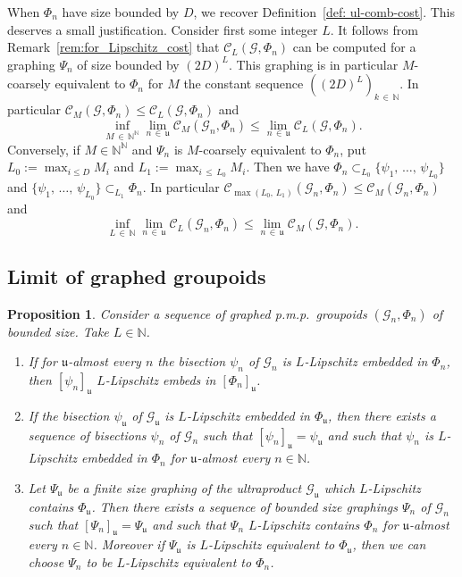 \documentclass[10pt]{amsart}
\newtheorem{prop}[cdrthm]{Proposition}
\theoremstyle{definition}
\newcommand{\Nmath}{\mathbb{N}}
\newcommand{\cost}{\mathcal{C}}
\newcommand{\cg}{\mathcal{G}}
\newcommand{\ul}{\mathfrak{u}}
\newcommand{\pmp}{p.m.p.\ }
\newcommand*{\romanenumi}{\renewcommand*{\theenumi}{\roman{enumi}}}
\begin{document}
When $\Phi_n$ have size bounded by $D$, we recover Definition~\ref{def: ul-comb-cost}. This deserves a small justification. Consider first some integer $L$. It follows from Remark~\ref{rem:for_Lipschitz_cost} that $\cost_{L}(\cg,\Phi_n)$ can be computed for a graphing $\Psi_n$ of size bounded by $(2D)^{L}$. This graphing is in particular $M$-coarsely equivalent to $\Phi_n$ for $M$ the constant sequence $((2D)^L)_{k\, \in\,\Nmath}$. In particular $\cost_M(\cg,\Phi_n) \leq \cost_{L}(\cg,\Phi_n)$ and
\[
\inf_{M\,\in\,\Nmath^\Nmath} \lim_{n\,\in\,\ul}\cost_M(\cg_n,\Phi_n) \leq \lim_{n\,\in\,\ul} \cost_{L}(\cg,\Phi_n).
\]
Conversely, if $M \in \Nmath^\Nmath$ and $\Psi_n$ is $M$-coarsely equivalent to $\Phi_n$, put $L_0 := \max_{i \leq D} M_i$ and $L_1:=\max_{i\,\leq\,L_0} M_i$. Then we have $\Phi_n \subset_{L_0} \{\psi_1,\,\dots,\,\psi_{L_0}\}$ and $\{\psi_1,\,\dots,\,\psi_{L_0}\} \subset_{L_1} \Phi_n$. In particular $\cost_{\max(L_0,\,L_1)}(\cg_n,\Phi_n) \leq \cost_M(\cg_n,\Phi_n)$ and
\[
\inf_{L\,\in\,\Nmath} \lim_{n\,\in\,\ul}\cost_L(\cg_n,\Phi_n) \leq \lim_{n\,\in\,\ul} \cost_{M}(\cg,\Phi_n).
\]


\subsection{Limit of graphed groupoids}

\begin{prop}\label{prop:compar}
Consider a sequence of graphed \pmp groupoids $(\cg_n,\Phi_n)$ of bounded size. Take $L\in\Nmath$.
\begin{enumerate}\romanenumi
\item \label{item: limit of L-Lip embedd gr are L-Lip embedd}
If for $\ul$-almost every $n$ the bisection $\psi_n$ of $\cg_n$ is $L$-Lipschitz embedded in $\Phi_n$, then $[\psi_n]_\ul$ $L$-Lipschitz embeds in $[\Phi_n]_\ul$.

\item \label{prop3.12.2}If the bisection $\psi_\ul$ of $\cg_\ul$ is $L$-Lipschitz embedded in $\Phi_\ul$, then there exists a sequence of bisections $\psi_n$ of $\cg_n$ such that $[\psi_n]_\ul=\psi_{\ul}$ and such that $\psi_n$ is $L$-Lipschitz embedded in $\Phi_n$ for $\ul$-almost every $n\in \Nmath$.

\item \label{prop3.12.3}Let $\Psi_\ul$ be a finite size graphing of the ultraproduct $\cg_\ul$ which $L$-Lipschitz contains $\Phi_\ul$. Then there exists a sequence of bounded size graphings $\Psi_n$ of $\cg_n$ such that $[\Psi_n]_\ul=\Psi_{\ul}$ and such that $\Psi_n$ $L$-Lipschitz contains $\Phi_n$ for $\ul$-almost every $n\in \Nmath$. Moreover if $\Psi_\ul$ is $L$-Lipschitz equivalent to $\Phi_\ul$, then we can choose $\Psi_n$ to be $L$-Lipschitz equivalent to $\Phi_n$.
\end{enumerate}
\end{prop}
\end{document}
